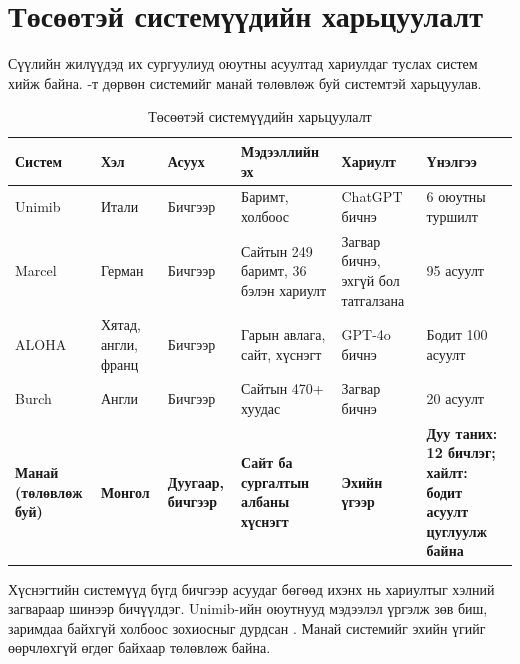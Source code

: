 \iffalse
\section{Төсөөтэй системүүдийн харьцуулалт}
\label{sec:lit-compare}

Сүүлийн жилүүдэд их сургуулиуд оюутны асуултад хариулдаг туслах систем хийж байна. -т дөрвөн системийг манай төлөвлөж буй системтэй харьцуулав.

\begin{table}[H]
\centering
\caption{Төсөөтэй системүүдийн харьцуулалт}
\label{tab:similar_systems}
\small
\begin{tabular}{|p{2.2cm}|p{1.9cm}|p{1.6cm}|p{3.0cm}|p{2.4cm}|p{2.4cm}|}
\hline
\textbf{Систем} & \textbf{Хэл} & \textbf{Асуух} & \textbf{Мэдээллийн эх} & \textbf{Хариулт} & \textbf{Үнэлгээ} \\
\hline
Unimib \cite{antico2024unimib} & Итали & Бичгээр & Баримт, холбоос & ChatGPT бичнэ & 6 оюутны туршилт \\
\hline
Marcel \cite{trienes2025marcel} & Герман & Бичгээр & Сайтын 249 баримт, 36 бэлэн хариулт & Загвар бичнэ, эхгүй бол татгалзана & 95 асуулт \\
\hline
ALOHA \cite{tao2025aloha} & Хятад, англи, франц & Бичгээр & Гарын авлага, сайт, хүснэгт & GPT-4o бичнэ & Бодит 100 асуулт \\
\hline
Burch \cite{matic2026burch} & Англи & Бичгээр & Сайтын 470+ хуудас & Загвар бичнэ & 20 асуулт \\
\hline
\textbf{Манай (төлөвлөж буй)} & \textbf{Монгол} & \textbf{Дуугаар, бичгээр} & \textbf{Сайт ба сургалтын албаны хүснэгт} & \textbf{Эхийн үгээр} & \textbf{Дуу таних: 12 бичлэг; хайлт: бодит асуулт цуглуулж байна} \\
\hline
\end{tabular}
\end{table}

Хүснэгтийн системүүд бүгд бичгээр асуудаг бөгөөд ихэнх нь хариултыг хэлний загвараар шинээр бичүүлдэг. Unimib-ийн оюутнууд мэдээлэл үргэлж зөв биш, заримдаа байхгүй холбоос зохиосныг дурдсан \cite{antico2024unimib}. Манай системийг эхийн үгийг өөрчлөхгүй өгдөг байхаар төлөвлөж байна.

